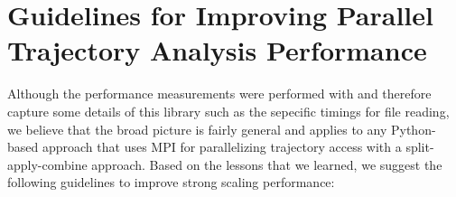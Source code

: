 
\section{Guidelines for Improving Parallel Trajectory Analysis Performance}
\label{sec:guidelines}

Although the performance measurements were performed with  and therefore capture some details of this  library such as the sepecific timings for file reading, we believe that the broad picture is fairly general and applies to any Python-based approach that uses MPI for parallelizing trajectory access with a split-apply-combine approach.
Based on the lessons that we learned, we suggest the following guidelines to improve strong scaling performance:

